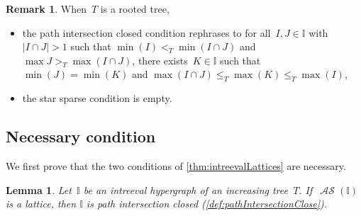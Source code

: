 \documentclass{amsart}
\newtheorem{lemma}[theorem]{Lemma}
\theoremstyle{definition}
\newtheorem{remark}[theorem]{Remark}
\DeclareMathOperator{\ASour}{\mathcal{AS}}  %
\newcommand{\II}{\mathbb I} %
\begin{document}
\begin{remark}
When~$T$ is a rooted tree,
\begin{itemize}
\item the path intersection closed condition rephrases to for all~$I,J\in \II$ with~$|I\cap J|> 1$ such that $\min(I) <_T \min(I\cap J)$ and  $\max J >_T \max (I\cap J)$, there exists~$K \in \II$ such that $\min(J) = \min(K)$ and ${\max(I\cap J) \le_T \max(K) \le_T \max(I)}$,
\item the star sparse condition is empty.
\end{itemize}
\end{remark}


\subsection{Necessary condition}
\label{subsec:necessary}

We first prove that the two conditions of \cref{thm:intreevalLattices} are necessary.

\begin{lemma}
\label{lem:pathIntersectionClosed}
Let~$\II$ be an intreeval hypergraph of an increasing tree~$T$.
If~$\ASour(\II)$ is a lattice, then $\II$ is path intersection closed (\cref{def:pathIntersectionClose}).
\end{lemma}
\end{document}

